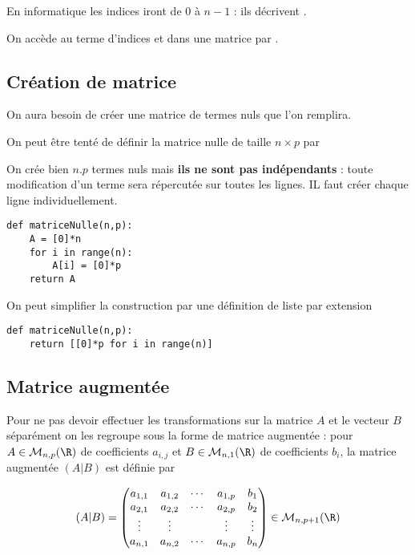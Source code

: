En informatique les indices iront de 0 à  $n-1$ : ils décrivent .

On accède au terme d'indices  et  dans une matrice  par .
\subsection{Création de matrice}
On aura besoin de créer une matrice de termes nuls que l'on remplira.

On peut être tenté de définir la matrice nulle de taille $n\times p$ par



On crée bien $n.p$ termes nuls mais {\bf ils ne sont pas indépendants} : toute modification d'un terme sera répercutée sur toutes les lignes. IL faut créer chaque ligne individuellement.
\begin{lstlisting}
def matriceNulle(n,p):
    A = [0]*n
    for i in range(n):
        A[i] = [0]*p
    return A
\end{lstlisting}
On peut simplifier la construction par une définition de liste par extension
\begin{lstlisting}
def matriceNulle(n,p):
    return [[0]*p for i in range(n)]
\end{lstlisting}
\newpage
\subsection{Matrice augmentée}
Pour ne pas devoir effectuer les transformations sur la matrice $A$ et le vecteur $B$ séparément on les regroupe sous la forme de  matrice augmentée : pour $A\in {\cal M}_{n,p}(\R)$ de coefficients $a_{i,j}$  et $B\in {\cal M}_{n,1}(\R)$ de coefficients $b_i$, la matrice augmentée $(A|B)$ est définie par

\[(A|B)=\begin{pmatrix}a_{1,1}&a_{1,2}&\cdots&a_{1,p}&b_1\\
a_{2,1}&a_{2,2}&\cdots&a_{2,p}&b_2\\
\vdots&\vdots&&\vdots&\vdots\\
a_{n,1}&a_{n,2}&\cdots&a_{n,p}&b_n\\
\end{pmatrix}\in{\cal M}_{n,p+1}({\R})\]

